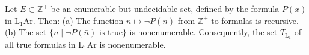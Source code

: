 Let $E \subset \mathbb{Z}^+$ be an enumerable but undecidable set, defined by the formula $P(x)$ in $\mathrm{L}_1\mathrm{Ar}$. Then:
(a) The function $n \mapsto \neg P(\bar{n})$ from $\mathbb{Z}^+$ to formulas is recursive.
(b) The set $\{n \mid \neg P(\bar{n}) \text{ is true}\}$ is nonenumerable.
Consequently, the set $T_{\mathrm{L}_1}$ of all true formulas in $\mathrm{L}_1\mathrm{Ar}$ is nonenumerable.